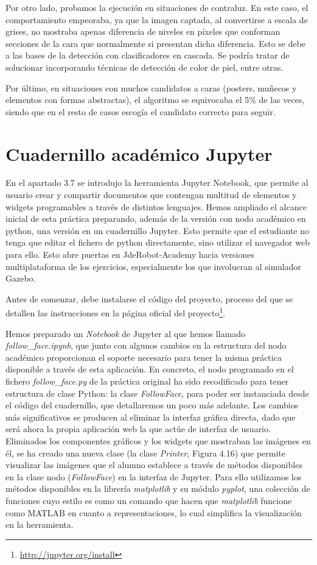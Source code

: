 Por otro lado, probamos la ejecución en situaciones de contraluz. En este caso, el comportamiento empeoraba, ya que la imagen captada, al convertirse a escala de grises, no mostraba apenas diferencia de niveles en píxeles que conforman secciones de la cara que normalmente si presentan dicha diferencia. Esto se debe a las bases de la detección con clasificadores en cascada. Se podría tratar de solucionar incorporando técnicas de detección de color de piel, entre otras.

Por último, en situaciones con muchos candidatos a caras (posters, muñecos y elementos con formas abstractas), el algoritmo se equivocaba el 5\% de las veces, siendo que en el resto de casos escogía el candidato correcto para seguir.

\section{Cuadernillo académico Jupyter}
En el apartado 3.7 se introdujo la herramienta Jupyter Notebook,  que permite al usuario crear y compartir documentos que contengan multitud de elementos y widgets programables a través de distintos lenguajes. Hemos ampliado el alcance inicial de esta práctica preparando, además de la versión con nodo académico en python, una versión en un cuadernillo Jupyter. Esto permite que el estudiante no tenga que
editar el fichero de python directamente, sino utilizar el navegador web para ello. Esto abre puertas en JdeRobot-Academy hacia versiones multiplataforma de los ejercicios, especialmente los que involucran al simulador Gazebo.

Antes de comenzar, debe instalarse el código del proyecto, proceso del que se detallen las instrucciones en la página oficial del proyecto\footnote{\url{http://jupyter.org/install}}.

Hemos preparado un \textit{Notebook} de Jupyter al que hemos llamado \textit{follow\_face.ipynb}, que junto con algunos cambios en la estructura del nodo académico proporcionan el soporte necesario para tener la misma práctica disponible a través de esta aplicación. En concreto, el nodo programado en el fichero \textit{follow\_face.py} de la práctica original ha sido recodificado para tener estructura de clase Python: la clase \textit{FollowFace}, para poder ser instanciada desde el código del cuadernillo, que detallaremos un poco más adelante. Los cambios más significativos se producen al eliminar la interfaz gráfica directa, dado que será ahora la propia aplicación web la que actúe de interfaz de usuario. Eliminados los componentes gráficos y los widgets que mostraban las imágenes en él, se ha creado una nueva clase (la clase \textit{Printer}, Figura 4.16) que permite visualizar las imágenes que el alumno establece a través de métodos disponibles en la clase nodo (\textit{FollowFace}) en la interfaz de Jupyter. Para ello utilizamos los métodos disponibles en la librería \textit{matplotlib} y su módulo \textit{pyplot},  una colección de funciones cuyo estilo es como un comando que hacen que \textit{matplotlib} funcione como MATLAB en cuanto a representaciones, lo cual simplifica la visualización en la herramienta. 

